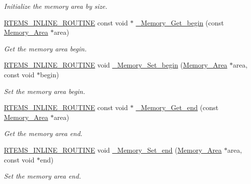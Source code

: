\begin{DoxyCompactItemize}
\begin{DoxyCompactList}\small\item\em Initialize the memory area by size. \end{DoxyCompactList}\item 
\mbox{\hyperlink{group__RTEMSScoreBaseDefs_gac216239df231d5dbd15e3520b0b9313f}{R\+T\+E\+M\+S\+\_\+\+I\+N\+L\+I\+N\+E\+\_\+\+R\+O\+U\+T\+I\+NE}} const void $\ast$ \mbox{\hyperlink{group__RTEMSScoreMemory_ga2b471b82c609b13f86f857a487292e83}{\+\_\+\+Memory\+\_\+\+Get\+\_\+begin}} (const \mbox{\hyperlink{structMemory__Area}{Memory\+\_\+\+Area}} $\ast$area)
\begin{DoxyCompactList}\small\item\em Get the memory area begin. \end{DoxyCompactList}\item 
\mbox{\hyperlink{group__RTEMSScoreBaseDefs_gac216239df231d5dbd15e3520b0b9313f}{R\+T\+E\+M\+S\+\_\+\+I\+N\+L\+I\+N\+E\+\_\+\+R\+O\+U\+T\+I\+NE}} void \mbox{\hyperlink{group__RTEMSScoreMemory_ga4a01873c6688b4746577d673664ddb37}{\+\_\+\+Memory\+\_\+\+Set\+\_\+begin}} (\mbox{\hyperlink{structMemory__Area}{Memory\+\_\+\+Area}} $\ast$area, const void $\ast$begin)
\begin{DoxyCompactList}\small\item\em Set the memory area begin. \end{DoxyCompactList}\item 
\mbox{\hyperlink{group__RTEMSScoreBaseDefs_gac216239df231d5dbd15e3520b0b9313f}{R\+T\+E\+M\+S\+\_\+\+I\+N\+L\+I\+N\+E\+\_\+\+R\+O\+U\+T\+I\+NE}} const void $\ast$ \mbox{\hyperlink{group__RTEMSScoreMemory_ga7901f87a55e1d2031465b9b6b535a78b}{\+\_\+\+Memory\+\_\+\+Get\+\_\+end}} (const \mbox{\hyperlink{structMemory__Area}{Memory\+\_\+\+Area}} $\ast$area)
\begin{DoxyCompactList}\small\item\em Get the memory area end. \end{DoxyCompactList}\item 
\mbox{\hyperlink{group__RTEMSScoreBaseDefs_gac216239df231d5dbd15e3520b0b9313f}{R\+T\+E\+M\+S\+\_\+\+I\+N\+L\+I\+N\+E\+\_\+\+R\+O\+U\+T\+I\+NE}} void \mbox{\hyperlink{group__RTEMSScoreMemory_gacd18befdd1d46d2a0fec4503728247ce}{\+\_\+\+Memory\+\_\+\+Set\+\_\+end}} (\mbox{\hyperlink{structMemory__Area}{Memory\+\_\+\+Area}} $\ast$area, const void $\ast$end)
\begin{DoxyCompactList}\small\item\em Set the memory area end. \end{DoxyCompactList}\item 

\end{DoxyCompactItemize}
